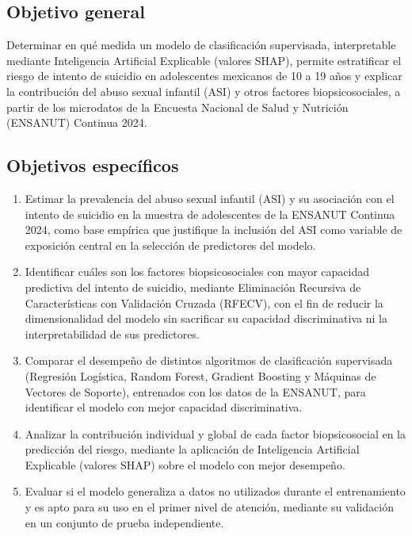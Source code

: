 \subsection{Objetivo general}

Determinar en qué medida un modelo de clasificación supervisada, interpretable mediante Inteligencia Artificial Explicable (valores SHAP), permite estratificar el riesgo de intento de suicidio en adolescentes mexicanos de 10 a 19 años y explicar la contribución del abuso sexual infantil (ASI) y otros factores biopsicosociales, a partir de los microdatos de la Encuesta Nacional de Salud y Nutrición (ENSANUT) Continua 2024.

\subsection{Objetivos específicos}

\begin{enumerate}[label=OE\arabic*.]
  \item Estimar la prevalencia del abuso sexual infantil (ASI) y su asociación con el intento de suicidio en la muestra de adolescentes de la ENSANUT Continua 2024, como base empírica que justifique la inclusión del ASI como variable de exposición central en la selección de predictores del modelo.
  \item Identificar cuáles son los factores biopsicosociales con mayor capacidad predictiva del intento de suicidio, mediante Eliminación Recursiva de Características con Validación Cruzada (RFECV), con el fin de reducir la dimensionalidad del modelo sin sacrificar su capacidad discriminativa ni la interpretabilidad de sus predictores.
  \item Comparar el desempeño de distintos algoritmos de clasificación supervisada (Regresión Logística, Random Forest, Gradient Boosting y Máquinas de Vectores de Soporte), entrenados con los datos de la ENSANUT, para identificar el modelo con mejor capacidad discriminativa.
  \item Analizar la contribución individual y global de cada factor biopsicosocial en la predicción del riesgo, mediante la aplicación de Inteligencia Artificial Explicable (valores SHAP) sobre el modelo con mejor desempeño.
  \item Evaluar si el modelo generaliza a datos no utilizados durante el entrenamiento y es apto para su uso en el primer nivel de atención, mediante su validación en un conjunto de prueba independiente.
\end{enumerate}

